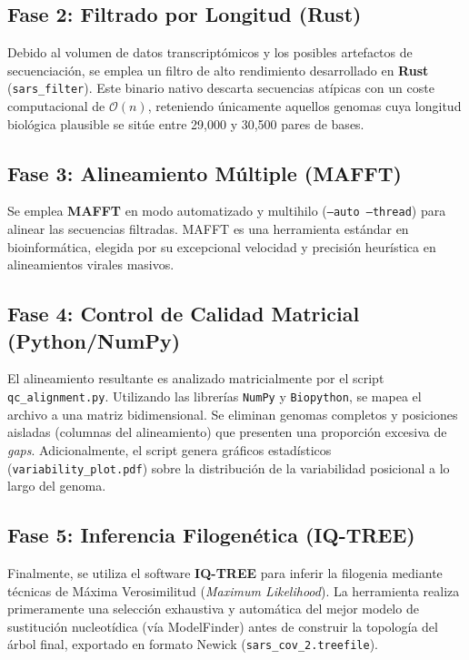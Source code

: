 \documentclass[12pt,a4paper]{article}
\begin{document}
\subsection{Fase 2: Filtrado por Longitud (Rust)}
Debido al volumen de datos transcriptómicos y los posibles artefactos de secuenciación, se emplea un filtro de alto rendimiento desarrollado en \textbf{Rust} (\texttt{sars\_filter}). Este binario nativo descarta secuencias atípicas con un coste computacional de $\mathcal{O}(n)$, reteniendo únicamente aquellos genomas cuya longitud biológica plausible se sitúe entre 29,000 y 30,500 pares de bases.

\subsection{Fase 3: Alineamiento Múltiple (MAFFT)}
Se emplea \textbf{MAFFT} en modo automatizado y multihilo (\texttt{--auto --thread}) para alinear las secuencias filtradas. MAFFT es una herramienta estándar en bioinformática, elegida por su excepcional velocidad y precisión heurística en alineamientos virales masivos.

\subsection{Fase 4: Control de Calidad Matricial (Python/NumPy)}
El alineamiento resultante es analizado matricialmente por el script \texttt{qc\_alignment.py}. Utilizando las librerías \texttt{NumPy} y \texttt{Biopython}, se mapea el archivo a una matriz bidimensional. Se eliminan genomas completos y posiciones aisladas (columnas del alineamiento) que presenten una proporción excesiva de \textit{gaps}. Adicionalmente, el script genera gráficos estadísticos (\texttt{variability\_plot.pdf}) sobre la distribución de la variabilidad posicional a lo largo del genoma.

\subsection{Fase 5: Inferencia Filogenética (IQ-TREE)}
Finalmente, se utiliza el software \textbf{IQ-TREE} para inferir la filogenia mediante técnicas de Máxima Verosimilitud (\textit{Maximum Likelihood}). La herramienta realiza primeramente una selección exhaustiva y automática del mejor modelo de sustitución nucleotídica (vía ModelFinder) antes de construir la topología del árbol final, exportado en formato Newick (\texttt{sars\_cov\_2.treefile}).
\end{document}
